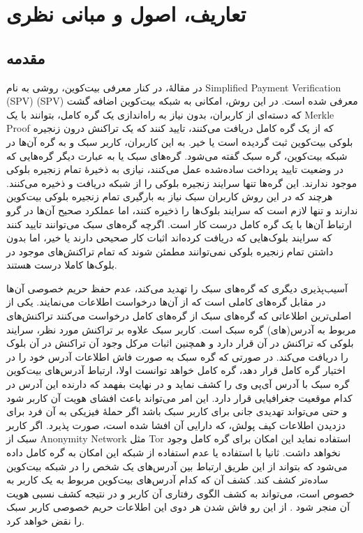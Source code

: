\chapter{تعاریف، اصول و مبانی نظری}
\label{def}
\section{مقدمه}
در مقالهٔ\cite{Nakamoto2009}، در کنار معرفی بیت‌کوین، روشی به نام 
\gls{Simplified Payment Verification (SPV)}
 (SPV) معرفی شده است. در این روش، امکانی به شبکه بیت‌کوین اضافه گشت که دسته‌ای از کاربران، بدون نیاز به راه‌اندازی یک گره کامل، بتوانند با  یک 
 \gls{Merkle Proof}
 که از یک گره کامل دریافت می‌کنند، تایید کنند که یک تراکنش درون زنجیره بلوکی بیت‌کوین ثبت گردیده‌ است یا خیر. به این کاربران، کاربر سبک و به گره آن‌ها در شبکه بیت‌کوین، گره سبک گفته می‌شود. گره‌های سبک یا به عبارت دیگر گره‌هایی که در وضعیت تایید پرداخت ساده‌شده عمل می‌کنند، نیازی به ذخیرهٔ تمام زنجیره بلوکی موجود ندارند. این گره‌ها تنها سرایند زنجیره بلوکی را از شبکه دریافت و ذخیره می‌کنند.  هرچند که در این روش کاربران سبک نیاز به بارگیری تمام زنجیره بلوکی بیت‌‌کوین ندارند و تنها لازم است که سرایند بلوک‌ها را ذخیره کنند،‌ اما عملکرد صحیح آن‌ها در گرو ارتباط آن‌ها با یک گره کامل درست کار است. اگرچه گره‌های سبک می‌توانند تایید کنند که سرایند بلوک‌هایی که دریافت کرده‌اند اثبات کار صحیحی دارند یا خیر، اما بدون داشتن تمام زنجیره بلوکی نمی‌توانند مطمئن شوند که تمام تراکنش‌های موجود در بلوک‌ها کاملا درست هستند.

آسیب‌پذیری دیگری که گره‌های سبک را تهدید می‌کند، عدم حفظ حریم خصوصی آن‌ها در مقابل گره‌های کاملی است که از آن‌ها درخواست اطلاعات می‌نمایند. یکی از اصلی‌ترین اطلاعاتی که گره‌های سبک از گره‌های کامل درخواست می‌کنند تراکنش‌های مربوط به آدرس(های) گره سبک است. کاربر سبک علاوه بر تراکنش مورد نظر، سرایند بلوکی که تراکنش در آن قرار دارد و همچنین اثبات مرکل وجود آن تراکنش در آن بلوک را دریافت می‌کند. در صورتی که گره سبک به صورت فاش اطلاعات آدرس خود را در اختیار گره کامل قرار دهد، گره کامل خواهد توانست اولا، ارتباط آدرس‌های بیت‌کوین گره سبک با آدرس آی‌پی وی را کشف نماید و در نهایت بفهمد که دارنده این آدرس در کدام موقعیت جغرافیایی قرار دارد. این امر می‌تواند باعث افشای هویت آن کاربر شود و حتی می‌تواند تهدیدی جانی برای کاربر سبک باشد اگر حملهٔ فیزیکی به آن فرد برای دزدیدن اطلاعات کیف پولش، که دارایی آن افشا شده است، صورت پذیرد. اگر کاربر سبک از 
\gls{Anonymity Network}
 مثل
  \gls{Tor}
  استفاده نماید این امکان برای گره کامل وجود نخواهد داشت. ثانیا با استفاده یا عدم استفاده از شبکه
 این امکان به گره کامل داده می‌شود که بتواند از این طریق ارتباط بین آدرس‌های یک شخص را در شبکه بیت‌کوین ساده‌تر کشف کند. کشف آن که کدام آدرس‌های بیت‌کوین مربوط به یک کاربر به خصوص است، می‌تواند به کشف الگوی رفتاری آن کاربر و در نتیجه کشف نسبی هویت آن منجر شود \cite{Ron2013}. از این رو فاش شدن هر دوی این اطلاعات حریم خصوصی کاربر سبک را نقض خواهد کرد.

